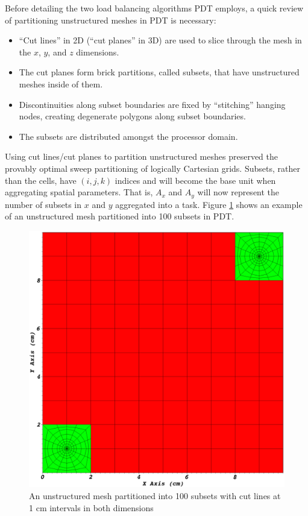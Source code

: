 Before detailing the two load balancing algorithms PDT employs, a quick review of partitioning unstructured meshes in PDT is necessary:
\begin{itemize}
\item ``Cut lines'' in 2D (``cut planes'' in 3D) are used to slice through the mesh in the $x$, $y$, and $z$ dimensions.
\item The cut planes form brick partitions, called subsets, that have unstructured meshes inside of them.
\item Discontinuities along subset boundaries are fixed by ``stitching'' hanging nodes, creating degenerate polygons along subset boundaries.
\item The subsets are distributed amongst the processor domain.
\end{itemize}
Using cut lines/cut planes to partition unstructured meshes preserved the provably optimal sweep partitioning \cite{mpadams2013,mpadams2015} of logically Cartesian grids.
Subsets, rather than the cells, have $(i,j,k)$ indices and will become the base unit when aggregating spatial parameters. That is, $A_x$ and $A_y$ will now represent the number of subsets in $x$ and $y$ aggregated into a task.
Figure \ref{partitioning_example} shows an example of an unstructured mesh partitioned into 100 subsets in PDT.
\begin{figure}[H]
\centering
\includegraphics[scale=0.2]{../figures/spiderweb_10x10_sparse.png}
\caption{An unstructured mesh partitioned into 100 subsets with cut lines at 1 cm intervals in both dimensions}
\label{partitioning_example}
\end{figure}

